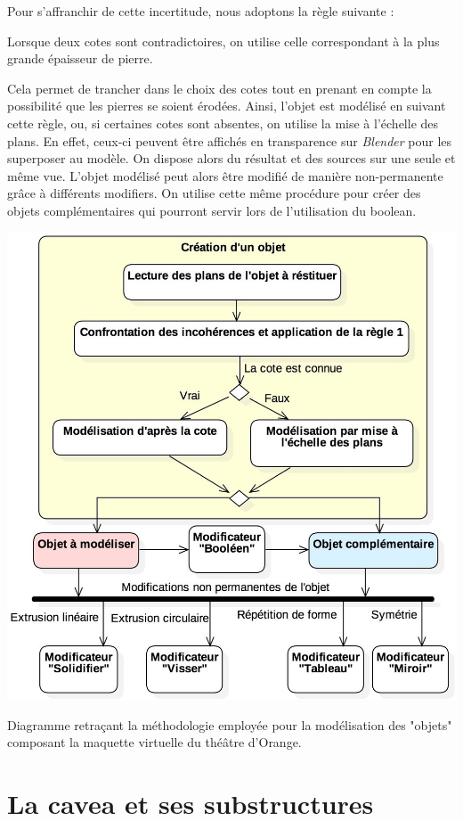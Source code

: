 %
Pour s'affranchir de cette incertitude, nous adoptons la règle suivante :
%
\begin{theo}\label{epaisseur}
	Lorsque deux cotes sont contradictoires, on utilise celle correspondant à la plus grande épaisseur de pierre.
\end{theo}
%
Cela permet de trancher dans le choix des cotes tout en prenant en compte la possibilité que les pierres se soient érodées. Ainsi, l'objet est modélisé en suivant cette règle, ou, si certaines cotes sont absentes, on utilise la mise à l'échelle des plans. En effet, ceux-ci peuvent être affichés en transparence sur \textit{Blender} pour les superposer au modèle. On dispose alors du résultat et des sources sur une seule et même vue. L'objet modélisé peut alors être modifié de manière non-permanente grâce à différents \glspl{modifier}. On utilise cette même procédure pour créer des objets complémentaires qui pourront servir lors de l'utilisation du \gls{boolean}. 
%
\begin{figureth}
	\includegraphics[width=0.8\linewidth]{images/metodo}
	\caption{Diagramme retraçant la méthodologie employée pour la modélisation des "objets" composant la maquette virtuelle du théâtre d'Orange.} 
	\label{metodo} 
\end{figureth} 



\section{La  \gls{cavea} et ses substructures}  
	\label{La cavea et ses substructures}

